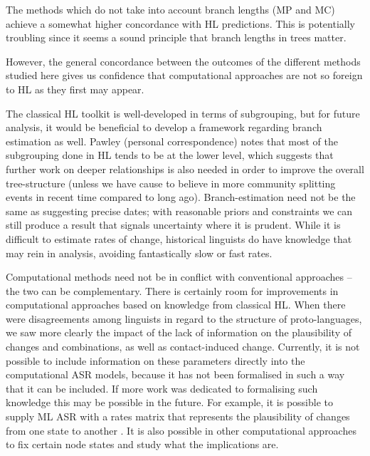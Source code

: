 \documentclass[12pt,letterpaper]{article}
\begin{document}
The methods which do not take into account branch lengths (MP and MC) achieve a somewhat higher concordance with HL predictions. This is potentially troubling since it seems a sound principle that branch lengths in trees matter.

However, the general concordance between the outcomes of the different methods studied here gives us confidence that computational approaches are not so foreign to HL as they first may appear. 

The classical HL toolkit is well-developed in terms of subgrouping, but for future analysis, it would be beneficial to develop a framework regarding branch estimation as well. Pawley (personal correspondence) notes that most of the subgrouping done in HL tends to be at the lower level, which suggests that further work on deeper relationships is also needed in order to improve the overall tree-structure (unless we have cause to believe in more community splitting events in recent time compared to long ago). Branch-estimation need not be the same as suggesting precise dates; with reasonable priors and constraints we can still produce a result that signals uncertainty where it is prudent. While it is difficult to estimate rates of change, historical linguists do have knowledge that may rein in analysis, avoiding fantastically slow or fast rates.

Computational methods need not be in conflict with conventional approaches -- the two can be complementary. There is certainly room for improvements in computational approaches based on knowledge from classical HL. When there were disagreements among linguists in regard to the structure of proto-languages, we saw more clearly the impact of the lack of information on the plausibility of changes and combinations, as well as contact-induced change. Currently, it is not possible to include information on these parameters directly into the computational ASR models, because it has not been formalised in such a way that it can be included. If more work was dedicated to formalising such knowledge this may be possible in the future. For example, it is possible to supply ML ASR with a rates matrix that represents the plausibility of changes from one state to another \citep[8--9]{R-corHMM}. It is also possible in other computational approaches to fix certain node states and study what the implications are.

\end{document}
